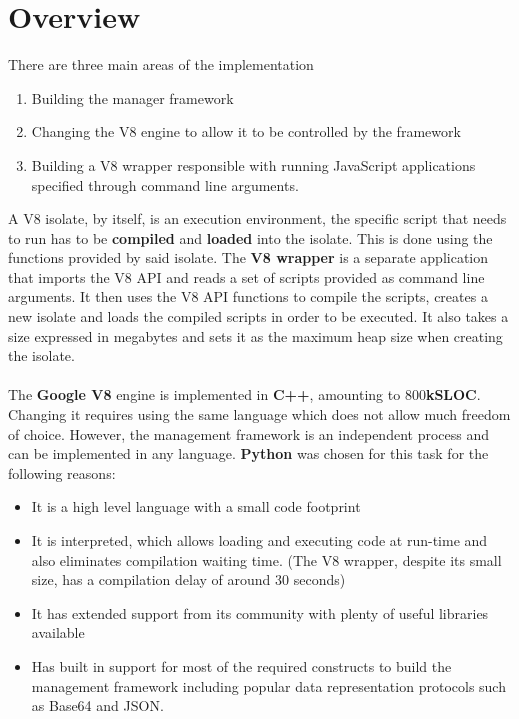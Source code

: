 \documentclass{l4proj}
\begin{document}
\section{Overview}
\hspace*{3em} There are three main areas of the implementation
\begin{enumerate}
\item Building the manager framework
\item Changing the V8 engine to allow it to be controlled by the framework
\item Building a V8 wrapper responsible with running JavaScript applications specified through command line arguments.
\end{enumerate}
\hspace*{3em} A V8 isolate, by itself, is an execution environment, the specific script that needs to run has to be \textbf{compiled} and \textbf{loaded} into the isolate. This is done using the functions provided by said isolate. The \textbf{V8 wrapper} is a separate application that imports the V8 API and reads a set of scripts provided as command line arguments. It then uses the V8 API functions to compile the scripts, creates a new isolate and loads the compiled scripts in order to be executed. It also takes a size expressed in megabytes and sets it as the maximum heap size when creating the isolate.
\\\\
\hspace*{3em} The \textbf{Google V8} engine is implemented in \textbf{C++}, amounting to 800\textbf{kSLOC}. Changing it requires using the same language which does not allow much freedom of choice. However, the management framework is an independent process and can be implemented in any language. \textbf{Python} was chosen for this task for the following reasons:
\begin{itemize}
\item It is a high level language with a small code footprint
\item It is interpreted, which allows loading and executing code at run-time and also eliminates compilation waiting time. (The V8 wrapper, despite its small size, has a compilation delay of around 30 seconds)
\item It has extended support from its community with plenty of useful libraries available
\item Has built in support for most of the required constructs to build the management framework including popular data representation protocols such as Base64 and JSON.
\end{itemize}
\end{document}
